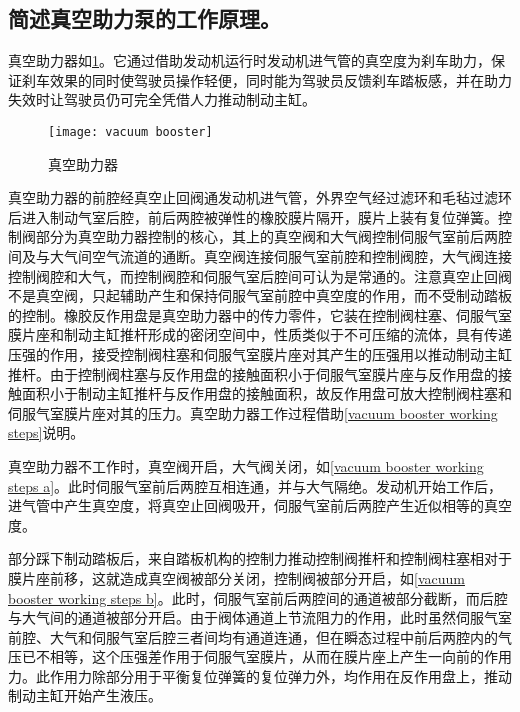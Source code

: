 \documentclass[UTF8]{ctexart}
\numberwithin{figure}{section}
\numberwithin{table}{section}
\begin{document}
\subsection{简述真空助力泵的工作原理。}

真空助力器如\cref{vacuum booster}。它通过借助发动机运行时发动机进气管的真空度为刹车助力，保证刹车效果的同时使驾驶员操作轻便，同时能为驾驶员反馈刹车踏板感，并在助力失效时让驾驶员仍可完全凭借人力推动制动主缸。

\begin{figure}[htbp]
	\centering
	\begin{minipage}[b]{0.4\textwidth}
		\centering
		\texttt{[image: vacuum booster]}
		\caption{真空助力器}
		\label{vacuum booster}
	\end{minipage}
\end{figure}

真空助力器的前腔经真空止回阀通发动机进气管，外界空气经过滤环和毛毡过滤环后进入制动气室后腔，前后两腔被弹性的橡胶膜片隔开，膜片上装有复位弹簧。控制阀部分为真空助力器控制的核心，其上的真空阀和大气阀控制伺服气室前后两腔间及与大气间空气流道的通断。真空阀连接伺服气室前腔和控制阀腔，大气阀连接控制阀腔和大气，而控制阀腔和伺服气室后腔间可认为是常通的。注意真空止回阀不是真空阀，只起辅助产生和保持伺服气室前腔中真空度的作用，而不受制动踏板的控制。橡胶反作用盘是真空助力器中的传力零件，它装在控制阀柱塞、伺服气室膜片座和制动主缸推杆形成的密闭空间中，性质类似于不可压缩的流体，具有传递压强的作用，接受控制阀柱塞和伺服气室膜片座对其产生的压强用以推动制动主缸推杆。由于控制阀柱塞与反作用盘的接触面积小于伺服气室膜片座与反作用盘的接触面积小于制动主缸推杆与反作用盘的接触面积，故反作用盘可放大控制阀柱塞和伺服气室膜片座对其的压力。真空助力器工作过程借助\cref{vacuum booster working steps}说明。

真空助力器不工作时，真空阀开启，大气阀关闭，如\cref{vacuum booster working steps a}。此时伺服气室前后两腔互相连通，并与大气隔绝。发动机开始工作后，进气管中产生真空度，将真空止回阀吸开，伺服气室前后两腔产生近似相等的真空度。

部分踩下制动踏板后，来自踏板机构的控制力推动控制阀推杆和控制阀柱塞相对于膜片座前移，这就造成真空阀被部分关闭，控制阀被部分开启，如\cref{vacuum booster working steps b}。此时，伺服气室前后两腔间的通道被部分截断，而后腔与大气间的通道被部分开启。由于阀体通道上节流阻力的作用，此时虽然伺服气室前腔、大气和伺服气室后腔三者间均有通道连通，但在瞬态过程中前后两腔内的气压已不相等，这个压强差作用于伺服气室膜片，从而在膜片座上产生一向前的作用力。此作用力除部分用于平衡复位弹簧的复位弹力外，均作用在反作用盘上，推动制动主缸开始产生液压。
\end{document}
